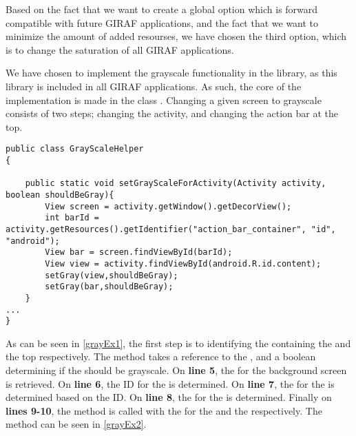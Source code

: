 Based on the fact that we want to create a global option which is forward
compatible with future GIRAF applications, and the fact that we want
to minimize the amount of added resourses, we have chosen the third
option, which is to change the saturation of all GIRAF applications.\nl

We have chosen to implement the grayscale functionality in the
 library, as this library is included in all GIRAF
applications. As such, the core of the implementation is made in the class
. Changing a given screen to grayscale consists of two
steps; changing the activity, and changing the action bar at the top.\nl

\begin{minipage}[H]{\linewidth}
\begin{lstlisting}[caption = Code used to determine the views for the activity and the top action bar., label = grayEx1] 
public class GrayScaleHelper
{

    public static void setGrayScaleForActivity(Activity activity, boolean shouldBeGray){
        View screen = activity.getWindow().getDecorView();
        int barId = activity.getResources().getIdentifier("action_bar_container", "id", "android");
        View bar = screen.findViewById(barId);
        View view = activity.findViewById(android.R.id.content);
        setGray(view,shouldBeGray);
        setGray(bar,shouldBeGray);
    }
...
}
\end{lstlisting}
\end{minipage}

As can be seen in \autoref{grayEx1}, the first step is to identifying the
 containing the  and the top 
respectively. The method  takes a reference to
the , and a boolean determining if the 
should be grayscale. On \textbf{line 5}, the  for the background
 screen is retrieved. On \textbf{line 6}, the ID for the
 is determined. On \textbf{line 7}, the  for the
 is determined based on the ID. On \textbf{line 8}, the
 for the  is determined. Finally on \textbf{lines 9-10}, the 
method is called with the  for the  and the
 respectively. The  method can be seen in
\autoref{grayEx2}.\nl

